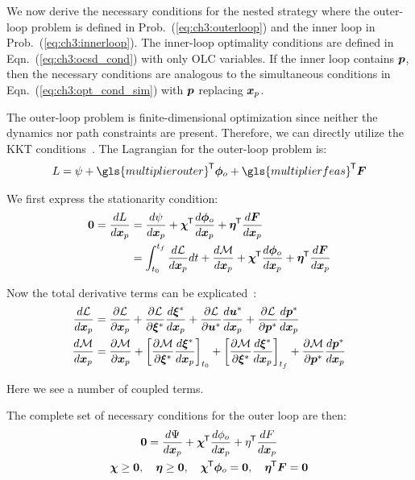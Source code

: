 We now derive the necessary conditions for the nested strategy where the outer-loop problem is defined in Prob.~(\ref{eq:ch3:outerloop}) and the inner loop in Prob.~(\ref{eq:ch3:innerloop}).
The inner-loop optimality conditions are defined in Eqn.~(\ref{eq:ch3:ocsd_cond}) with only OLC variables.
If the inner loop contains $\bm{p}$, then the necessary conditions are analogous to the simultaneous conditions in Eqn.~(\ref{eq:ch3:opt_cond_sim}) with $\bm{p}$ replacing $\bm{x}_p$.

The outer-loop problem is finite-dimensional optimization since neither the dynamics nor path constraints are present. Therefore, we can directly utilize the KKT conditions~\cite{Papalambros2017a}. The Lagrangian for the outer-loop problem is:
\begin{align}
L = \psi + \gls{multiplierouter}\tran \bm{\phi}_o + \gls{multiplierfeas}\tran \bm{F}
\end{align}

\noindent We first express the stationarity condition:
\begin{subequations}
\label{eq:ch3:nested_stationarity}
\begin{align}
\bm{0} = \frac{d L}{d \bm{x}_p} &= \frac{d \psi}{d \bm{x}_p} + \bm{\chi}^{\mkern-1.5mu\mathsf{T}} \frac{d \bm{\phi}_o}{d \bm{x}_p} + \bm{\eta}^{\mkern-1.5mu\mathsf{T}} \frac{d \bm{F}}{d \bm{x}_p} \\
&= \int_{t_0}^{t_f} \frac{d \mathcal{L}}{d \bm{x}_p} dt + \frac{d \mathcal{M}}{d \bm{x}_p} + \bm{\chi}^{\mkern-1.5mu\mathsf{T}} \frac{d \bm{\phi}_o}{d \bm{x}_p} + \bm{\eta}^{\mkern-1.5mu\mathsf{T}} \frac{d \bm{F}}{d \bm{x}_p}
\end{align}
\end{subequations}

\noindent Now the total derivative terms can be explicated~\cite{Weisstein2016a}:
\begin{subequations}
\begin{align}
\frac{d \mathcal{L}}{d \bm{x}_p} &= \frac{\partial \mathcal{L}}{\partial \bm{x}_p} + \frac{\partial \mathcal{L}}{\partial \bm{\xi}^*}  \frac{d \bm{\xi}^*}{d \bm{x}_p} + \frac{\partial \mathcal{L}}{\partial \bm{u}^*} \frac{d \bm{u}^*}{d \bm{x}_p} + \frac{\partial \mathcal{L}}{\partial \bm{p}^*} \frac{d \bm{p}^*}{d \bm{x}_p} \\
\frac{d \mathcal{M}}{d \bm{x}_p} &= \frac{\partial \mathcal{M}}{\partial \bm{x}_p} + \left[ \frac{\partial \mathcal{M}}{\partial \bm{\xi}^*}  \frac{d \bm{\xi}^*}{d \bm{x}_p} \right]_{t_0} + \left[ \frac{\partial \mathcal{M}}{\partial \bm{\xi}^*}  \frac{d \bm{\xi}^*}{d \bm{x}_p} \right]_{t_f} + \frac{\partial \mathcal{M}}{\partial \bm{p}^*}  \frac{d \bm{p}^*}{d \bm{x}_p} \label{eq:ch3:total_der_mayer}
\end{align}
\end{subequations}

\noindent Here we see a number of coupled terms.

The complete set of necessary conditions for the outer loop are then:
\begin{subequations}
\label{eq:ch3:nested_cond}
\begin{gather}
\bm{0} = \frac{d \Psi}{d \bm{x}_p} + \bm{\chi}^{\mkern-1.5mu\mathsf{T}} \frac{d \phi_o}{d \bm{x}_p} + \eta^{\mkern-1.5mu\mathsf{T}} \frac{d F}{d \bm{x}_p} \\
\bm{\chi} \geq \bm{0}, \quad \bm{\eta} \geq \bm{0}, \quad 
\bm{\chi}^{\mkern-1.5mu\mathsf{T}} \bm{\phi}_o = \bm{0}, \quad \bm{\eta}^{\mkern-1.5mu\mathsf{T}} \bm{F} = \bm{0}
\end{gather}
\end{subequations}

